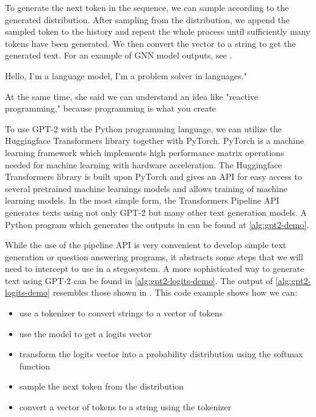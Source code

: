 To generate the next token in the sequence, we can sample according to the generated distribution.
After sampling from the distribution, we append the sampled token to the history and repeat the whole process until sufficiently many tokens have been generated.
We then convert the vector to a string to get the generated text.
For an example of GNN model outputs, see .

\begin{example}
	Hello, I'm a language model, I'm a problem solver in languages."

	At the same time, she said we can understand an idea like "reactive programming," because programming is what you create
	\label{example:gpt2-output-sample}
\end{example}

To use GPT-2 with the Python programming language, we can utilize the Huggingface Transformers library together with PyTorch.
PyTorch is a machine learning framework which implements high performance matrix operations needed for machine learning with hardware acceleration.
The Huggingface Transformers library is built upon PyTorch and gives an API for easy access to several pretrained machine learnings models and allows training of machine learning models.
In the most simple form, the Transformers Pipeline API generates texts using not only GPT-2 but many other text generation models.
A Python program which generates the outputs in  can be found at \autoref{alg:gpt2-demo}.


While the use of the pipeline API is very convenient to develop simple text generation or question answering programs, it abstracts some steps that we will need to intercept to use in a stegosystem.
A more sophisticated way to generate text using GPT-2 can be found in \autoref{alg:gpt2-logits-demo}.
The output of \autoref{alg:gpt2-logits-demo} resembles those shown in . 
This code example shows how we can:

\begin{itemize}
	\item use a tokenizer to convert strings to a vector of tokens
	\item use the model to get a logits vector
	\item transform the logits vector into a probability distribution using the softmax function
	\item sample the next token from the distribution
	\item convert a vector of tokens to a string using the tokenizer
\end{itemize}

